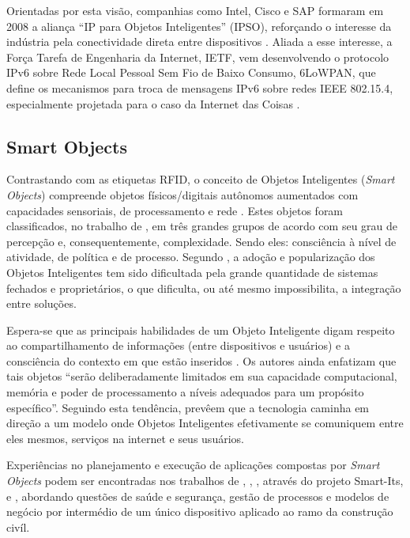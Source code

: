 \documentclass[twoside,english,brazilian]{UNISINOSmonografia}
\begin{document}
	Orientadas por esta visão, companhias como Intel, Cisco e SAP formaram em 
	2008 a aliança ``IP para Objetos Inteligentes'' (IPSO), reforçando o 
	interesse da indústria pela conectividade direta entre dispositivos 
	\cite{Dunkels2008, Mattern2010a}. 
	Aliada a esse interesse, a Força Tarefa de Engenharia da Internet, IETF, 
	vem desenvolvendo o protocolo IPv6 sobre Rede Local Pessoal Sem Fio de 
	Baixo Consumo, 6LoWPAN, que define os mecanismos para troca de mensagens 
	IPv6 sobre redes IEEE 802.15.4, especialmente projetada para o caso da 
	Internet das Coisas \cite{Gomez2010}.

\subsection{Smart Objects}
	Contrastando com as etiquetas RFID, o conceito de Objetos Inteligentes 
	(\textit{Smart Objects}) compreende objetos físicos/digitais autônomos 
	aumentados com capacidades sensoriais, de processamento e rede 
	\cite{Gellersen2001}.
	Estes objetos foram classificados, no trabalho de , em 
	três grandes grupos de acordo com seu grau de percepção e, 
	consequentemente, complexidade. Sendo eles: consciência à nível de 
	atividade, de política e de processo.
	Segundo , a adoção e popularização dos Objetos 
	Inteligentes tem sido dificultada pela grande quantidade de sistemas 
	fechados e proprietários, o que dificulta, ou até mesmo impossibilita, a 
	integração entre soluções. 
	
	Espera-se que as principais habilidades de um Objeto Inteligente digam 
	respeito ao compartilhamento de informações (entre dispositivos e 
	usuários) e a consciência do contexto em que estão inseridos 
	\cite{Gellersen2001}. 
	Os autores ainda enfatizam que tais objetos ``serão deliberadamente 
	limitados em sua capacidade computacional, memória e poder de 
	processamento a níveis adequados para um propósito específico''. 
	Seguindo esta tendência,  prevêem que a tecnologia 
	caminha em direção a um modelo onde Objetos Inteligentes efetivamente se 
	comuniquem entre eles mesmos, serviços na internet e seus usuários.
	
	Experiências no planejamento e execução de aplicações compostas por 
	\textit{Smart Objects} podem ser encontradas nos trabalhos de 
	, , 
	, através do projeto Smart-Its, e 
	, abordando questões de saúde e segurança, gestão 
	de processos e modelos de negócio por intermédio de um único dispositivo 
	aplicado ao ramo da construção civíl.
\end{document}
